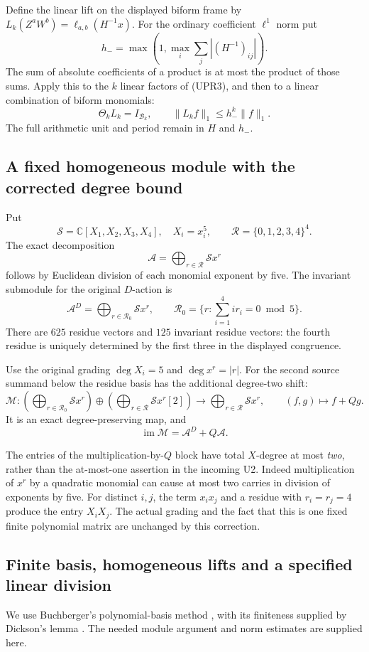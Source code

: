 Define the linear lift on the displayed biform frame by
\(L_k(Z^aW^b)=\ell_{a,b}(H^{-1}x)\).
For the ordinary coefficient \(\ell^1\) norm put
\[
h_-=\max\left(1,\max_i\sum_j|(H^{-1})_{ij}|\right).
\]
The sum of absolute coefficients of a product is at most the
product of those sums.  Apply this to the \(k\) linear factors of
(UPR3), and then to a linear combination of biform monomials:
\[
\Theta_kL_k=I_{\mathcal B_k},\qquad
\|L_kf\|_1\le h_-^k\|f\|_1.
\tag{UPR5}
\]
The full arithmetic unit and period remain in \(H\) and \(h_-\).

\subsection{A fixed homogeneous module with the corrected degree bound}
Put
\[
\mathcal S=\mathbb C[X_1,X_2,X_3,X_4],\quad X_i=x_i^5,\qquad
\mathcal R=\{0,1,2,3,4\}^4.
\]
The exact decomposition
\[
\mathcal A=\bigoplus_{r\in\mathcal R}\mathcal S x^r
\tag{UPR6}
\]
follows by Euclidean division of each monomial exponent by five.
The invariant submodule for the original \(D\)-action is
\[
\mathcal A^D=\bigoplus_{r\in\mathcal R_0}\mathcal S x^r,\qquad
\mathcal R_0=\{r:\textstyle\sum_{i=1}^4 i r_i=0\bmod5\}.
\tag{UPR7}
\]
There are \(625\) residue vectors and \(125\) invariant residue
vectors: the fourth residue is uniquely determined by the first
three in the displayed congruence.

Use the original grading \(\deg X_i=5\) and \(\deg x^r=|r|\).
For the second source summand below the residue basis has the
additional degree-two shift:
\[
\mathcal M:
\left(\bigoplus_{r\in\mathcal R_0}\mathcal Sx^r\right)
\oplus
\left(\bigoplus_{r\in\mathcal R}\mathcal Sx^r[2]\right)
\longrightarrow
\bigoplus_{r\in\mathcal R}\mathcal Sx^r,\qquad
(f,g)\longmapsto f+Qg.
\tag{UPR8}
\]
It is an exact degree-preserving map, and
\[
\operatorname{im}\mathcal M=\mathcal A^D+Q\mathcal A.
\tag{UPR9}
\]

The entries of the multiplication-by-\(Q\) block have total
\(X\)-degree at most \emph{two}, rather than the at-most-one assertion
in the incoming U2.  Indeed multiplication of \(x^r\) by a quadratic
monomial can cause at most two carries in division of exponents
by five.  For distinct \(i,j\), the term \(x_ix_j\) and a residue
with \(r_i=r_j=4\) produce the entry \(X_iX_j\).  The actual
grading and the fact that this is one fixed finite polynomial
matrix are unchanged by this correction.

\subsection{Finite basis, homogeneous lifts and a specified linear division}
We use Buchberger's polynomial-basis method
\cite{human:buchberger2006}, with its finiteness supplied by
Dickson's lemma \cite{human:dickson1913}.  The needed module argument
and norm estimates are supplied here.

